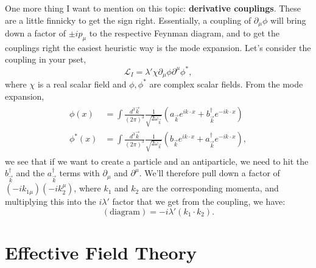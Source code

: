\documentclass[12pt, oneside]{article}   	%
\theoremstyle{definition}
\begin{document}
One more thing I want to mention on this topic: \textbf{derivative couplings}. These are a little finnicky to get the sign right. Essentially, a coupling of $\partial_\mu\phi$ will bring down a factor of $\pm i p_\mu$ to the respective Feynman diagram, and to get the couplings right the easiest heuristic way is the mode expansion. Let's consider the coupling in your pset,
\begin{equation}
	\mathcal L_I = \lambda'  \chi \partial_\mu\phi \partial^\mu\phi^*,
\end{equation}
where $\chi$ is a real scalar field and $\phi, \phi^*$ are complex scalar fields. From the mode expansion, 
\begin{align} \begin{split}
	\phi(x) &= \int \frac{d^3\vec k}{(2\pi)^3} \frac{1}{\sqrt{2\omega_{\vec k}}} (a_{\vec k} e^{ik\cdot x} + b_{\vec k}^\dagger e^{-ik\cdot x}) \\
	\phi^*(x) &= \int \frac{d^3\vec k}{(2\pi)^3} \frac{1}{\sqrt{2\omega_{\vec k}}} (b_{\vec k} e^{ik\cdot x} + a_{\vec k}^\dagger e^{-ik\cdot x}),
\end{split} \end{align}
we see that if we want to create a particle and an antiparticle, we need to hit the $b_{\vec k}^\dagger$ and the $a_{\vec k}^\dagger$ terms with $\partial_\mu$ and $\partial^\mu$. We'll therefore pull down a factor of $(-ik_{1\mu})(-ik_2^\mu)$, where $k_1$ and $k_2$ are the corresponding momenta, and multiplying this into the $i\lambda'$ factor that we get from the coupling, we have:
\begin{equation}
	(\mathrm{diagram}) = -i\lambda' (k_1\cdot k_2).
\end{equation}

\section*{Effective Field Theory}
\end{document}
